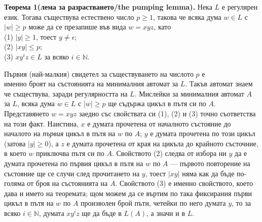 \documentclass[openany]{book}
\begin{document}
    \vspace{15pt}

    \textbf{Теорема 1(лема за разрастването/the pumping lemma).} Нека $L$ е регулярен
    език. Тогава съществува естествено число $p \geq 1$, такова че всяка дума $w \in L$
    с $|w| \geq p$ може да се презапише във вида $w = xyz$, като \\
    (1) $|y| \geq 1$, тоест $y \neq \epsilon$; \\
    (2) $|xy| \leq p$; \\
    (3) $xy^iz \in L$ за всяко $i \in \mathbb{N}$.

    \vspace{15pt}

    \hspace{15pt}Първия (най-малкия) свидетел за съществуването на числото $p$ е \\
    именно броят на състоянията на минималния автомат за $L$. Такъв автомат знаем че 
    съществува, заради регулярността на $L$. Мислейки за минималния автомат $A$ за $L$,
    всяка дума $w \in L$ с $|w| \geq p$ ще съдържа цикъл в пътя си по $A$. Представянето
    $w = xyz$ заедно със свойствата си (1), (2) и (3) точно съответства на този факт.
    Наистина, $x$ е думата прочетена от началното състояние до началото на \textit{първия}
    цикъл в пътя на $w$ по $A$; 
    $y$ е думата прочетена по този цикъл (затова $|y| \geq 0$), а $z$ е думата прочетена
    от края на цикъла до крайното състочние, в което $w$ приключва пътя си по $A$. 
    Свойството (2) следва от избора ни $y$ да е думата прочетена по първия цикъл в пътя
    на $w$ по $A$ — първото повторение на състояние ще се случи след прочитането на $y$,
    тоест $|xy|$ няма как да бъде по-голяма от броя на състоянията на $A$. Свойството
    (3) е именно свойството, което дава и името на теоремата; щом можем да се въртим
    по така фиксирания първи цикъл в пътя на $w$ по $A$ произволен брой пъти, четейки
    по него думата $y$, то за всяко $i \in \mathbb{N}$, думата $xy^iz$ ще да бъде в
    $L(A)$, а значи и в $L$. \\

    \vspace{15pt}
\end{document}
